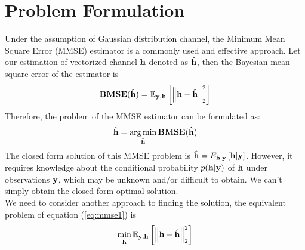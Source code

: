 \documentclass[journal,12pt,onecolumn,draftclsnofoot]{IEEEtran}
\begin{document}
    \section{Problem Formulation}
        Under the assumption of Gaussian distribution channel, the Minimum Mean Square Error (MMSE) estimator is a commonly used and effective approach.
        Let our estimation of vectorized channel ${\bf h}$ denoted as $\hat{{\bf h}}$, then the Bayesian mean square error of the estimator is 
        \begin{equation} \label{eq:bmse}
            {\bf B}{\bf M}{\bf S}{\bf E}(\hat{{\bf h}}) = \mathbb{E}_{{\bf y},{\bf h}}\left[\left\| {\bf h}-\hat{{\bf h}} \right\|^2_2\right]
        \end{equation}
        Therefore, the problem of the MMSE estimator can be formulated as:
        \begin{equation} \label{eq:mmse1}
            \hat{{\bf h}} = \operatorname*{arg\,min}_{\hat{{\bf h}}} {\bf B}{\bf M}{\bf S}{\bf E}(\hat{{\bf h}})
        \end{equation}
        The closed form solution of this MMSE problem is $\hat{{\bf h}} = E_{{\bf h}|{\bf y}}\left[{\bf h}|{\bf y}\right]$. However, it requires knowledge about the conditional probability
        $p({\bf h}|{\bf y})$ of ${\bf h}$ under observations ${\bf y}$, which may be unknown and/or difficult to obtain. We can't simply obtain the closed form optimal solution.\\
        We need to consider another approach to finding the solution, the equivalent problem of equation (\ref{eq:mmse1}) is
        \begin{equation} \label{eq:mmse2}
            \min_{\hat{{\bf h}}} \mathbb{E}_{{\bf y},{\bf h}}\left[\left\| {\bf h}-\hat{{\bf h}} \right\|^2_2\right]
        \end{equation}\\
\end{document}
